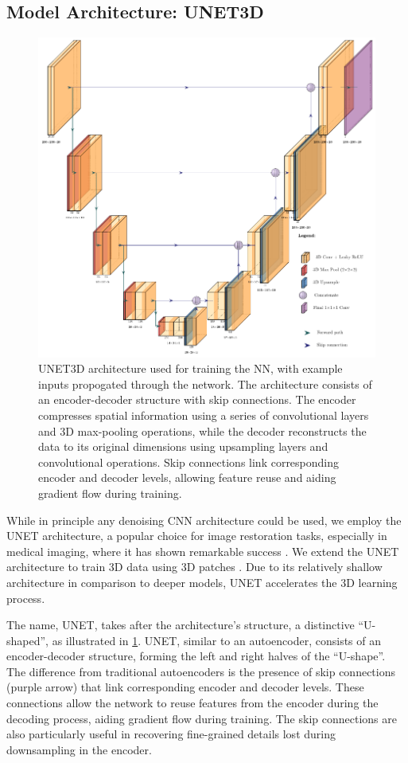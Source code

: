 \subsection{Model Architecture: UNET3D}
\begin{figure}
    \centering
    \includegraphics[width=0.8\linewidth]{images/unet_architecture.pdf}
    \caption{UNET3D architecture used for training the \gls{NN}, with example inputs propogated through the network. The architecture consists of an encoder-decoder structure with skip connections. The encoder compresses spatial information using a series of convolutional layers and 3D max-pooling operations, while the decoder reconstructs the data to its original dimensions using upsampling layers and convolutional operations. Skip connections link corresponding encoder and decoder levels, allowing feature reuse and aiding gradient flow during training.}
    \label{fig:unet-architecture}
\end{figure}

While in principle any denoising \gls{CNN} architecture could be used, we employ the UNET architecture, a popular choice for image restoration tasks, especially in medical imaging, where it has shown remarkable success \cite{ronnebergerUNetConvolutionalNetworks}. We extend the UNET architecture to train 3D data using 3D patches \cite{cicek3DUNetLearning2016}. Due to its relatively shallow architecture in comparison to deeper models, UNET accelerates the 3D learning process.

The name, UNET, takes after the architecture’s structure, a distinctive “U-shaped”, as illustrated in \cref{fig:unet-architecture}. UNET, similar to an autoencoder, consists of an encoder-decoder structure, forming the left and right halves of the “U-shape”. The difference from traditional autoencoders is the presence of skip connections (purple arrow) that link corresponding encoder and decoder levels. These connections allow the network to reuse features from the encoder during the decoding process, aiding gradient flow during training. The skip connections are also particularly useful in recovering fine-grained details lost during downsampling in the encoder.

